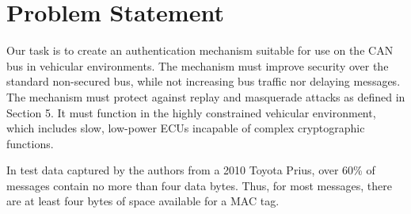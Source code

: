 \section{Problem Statement}

Our task is to create an authentication mechanism suitable for use on the CAN bus in vehicular environments. 
The mechanism must improve security over the standard non-secured bus, while 
not increasing bus traffic nor delaying messages.
The mechanism must protect against replay and masquerade attacks as defined in Section 5.
It must function in the highly constrained vehicular environment,
which includes slow, low-power ECUs incapable of complex cryptographic functions.


In test data captured by the authors from a 2010 Toyota Prius, 
over 60\% of messages contain no more than four data bytes. 
Thus, for most messages, there are at least four bytes of space
available for a MAC tag.

